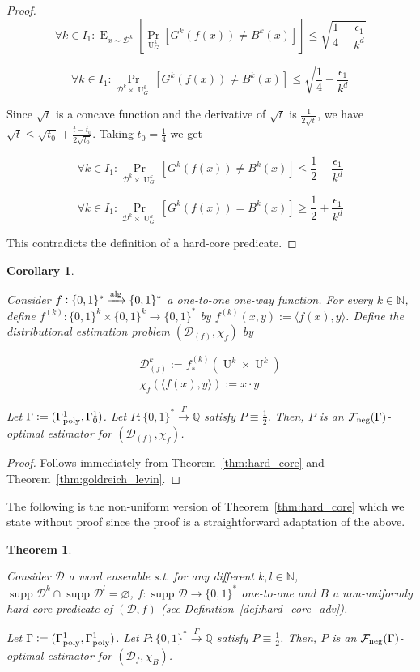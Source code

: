 \documentclass{article}
\numberwithin{equation}{section}
\theoremstyle{definition}
\theoremstyle{plain}
\newtheorem{theorem}{Theorem}[section]
\newtheorem{corollary}{Corollary}[section]
\newcommand{\Bool}{\{0,1\}}
\newcommand{\Words}{{\Bool^*}}
\newcommand{\WordsLen}[1]{{\Bool^{#1}}}
\DeclareMathOperator{\Supp}{supp}
\DeclareMathOperator{\Prb}{Pr}
\DeclareMathOperator{\E}{E}
\DeclareMathOperator{\Un}{U}
\newcommand{\Nats}{\mathbb{N}}
\newcommand{\Rats}{\mathbb{Q}}
\newcommand{\Chev}[1]{\langle #1 \rangle}
\newcommand{\Dist}{\mathcal{D}}
\newcommand{\Fall}{\mathcal{F}}
\newcommand{\GammaPoly}{\Gamma_{\textnormal{poly}}}
\newcommand{\Alg}{\xrightarrow{\textnormal{alg}}}
\newcommand{\Scheme}{\xrightarrow{\Gamma}}
\begin{document}
\begin{proof}
$$ \forall k \in I_1: \E_{x \sim \Dist^k}[\Prb_{\Un_G^k}[G^k(f(x)) \ne B^k(x)]] \leq \sqrt{\frac{1}{4} - \frac{\epsilon_1}{k^d}} $$

$$ \forall k \in I_1: \Prb_{\Dist^{k} \times \Un_G^k}[G^k(f(x)) \ne B^k(x)] \leq \sqrt{\frac{1}{4} - \frac{\epsilon_1}{k^d}} $$

Since $\sqrt{t}$ is a concave function and the derivative of $\sqrt{t}$ is $\frac{1}{2\sqrt{t}}$, we have $\sqrt{t} \leq \sqrt{t_0} + \frac{t-t_0}{2\sqrt{t_0}}$. Taking ${t_0}=\frac{1}{4}$ we get

$$ \forall k \in I_1: \Prb_{\Dist^{k} \times \Un_G^k}[G^k(f(x)) \ne B^k(x)] \leq \frac{1}{2}-\frac{\epsilon_1}{k^d}$$

$$ \forall k \in I_1: \Prb_{\Dist^{k} \times \Un_G^k}[G^k(f(x)) = B^k(x)] \geq \frac{1}{2}+\frac{\epsilon_1}{k^d}$$

This contradicts the definition of a hard-core predicate.
\end{proof}

\begin{corollary}
\label{crl:one_way}

Consider $f: \Words \Alg \Words$ a one-to-one one-way function. For every ${k \in \Nats}$, define $f^{(k)}: \WordsLen{k} \times \WordsLen{k} \rightarrow \Words$ by ${f^{(k)}(x,y):=\Chev{f(x),y}}$. Define the distributional estimation problem $(\Dist_{(f)}, \chi_f)$ by 

\begin{align*}
\Dist_{(f)}^k:=f_*^{(k)}(\Un^k \times \Un^k) \\
\chi_f(\Chev{f(x),y}):=x \cdot y
\end{align*}

Let $\Gamma:=(\GammaPoly^1,\Gamma_0^1)$. Let $P: \Words \Scheme \Rats$ satisfy $P \equiv \frac{1}{2}$. Then, $P$ is an $\Fall_{\textnormal{neg}}(\Gamma)$-optimal estimator for $(\Dist_{(f)}, \chi_f)$.

\end{corollary}

\begin{proof}

Follows immediately from Theorem~\ref{thm:hard_core} and Theorem~\ref{thm:goldreich_levin}.
\end{proof}

The following is the non-uniform version of Theorem~\ref{thm:hard_core} which we state without proof since the proof is a straightforward adaptation of the above.

\begin{theorem}
\label{thm:hard_core_circ}

Consider $\Dist$ a word ensemble s.t. for any different $k,l \in \Nats$, $\Supp \Dist^k \cap \Supp \Dist^l = \varnothing$, $f: \Supp \Dist \rightarrow \Words$ one-to-one and $B$ a non-uniformly hard-core predicate of $(\Dist,f)$ (see Definition~\ref{def:hard_core_adv}). 

Let $\Gamma:=(\GammaPoly^1,\GammaPoly^1)$. Let $P: \Words \Scheme \Rats$ satisfy $P \equiv \frac{1}{2}$. Then, $P$ is an $\Fall_{\textnormal{neg}}(\Gamma)$-optimal estimator for $(\Dist_f, \chi_B)$.

\end{theorem}
\end{document}
